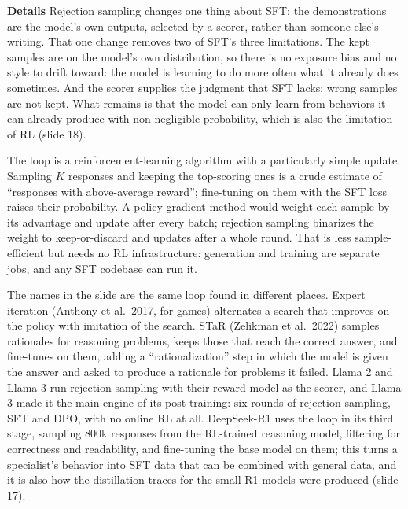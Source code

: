 \documentclass[11pt,letterpaper]{article}
\newcommand{\para}[1]{\medskip\noindent\textbf{#1}\quad}
\begin{document}
\para{Details} Rejection sampling changes one thing about SFT: the demonstrations are the model's own outputs, selected by a scorer, rather than someone else's writing. That one change removes two of SFT's three limitations. The kept samples are on the model's own distribution, so there is no exposure bias and no style to drift toward: the model is learning to do more often what it already does sometimes. And the scorer supplies the judgment that SFT lacks: wrong samples are not kept. What remains is that the model can only learn from behaviors it can already produce with non-negligible probability, which is also the limitation of RL (slide 18).

The loop is a reinforcement-learning algorithm with a particularly simple update. Sampling $K$ responses and keeping the top-scoring ones is a crude estimate of ``responses with above-average reward''; fine-tuning on them with the SFT loss raises their probability. A policy-gradient method would weight each sample by its advantage and update after every batch; rejection sampling binarizes the weight to keep-or-discard and updates after a whole round. That is less sample-efficient but needs no RL infrastructure: generation and training are separate jobs, and any SFT codebase can run it.

The names in the slide are the same loop found in different places. Expert iteration (Anthony et al.\ 2017, for games) alternates a search that improves on the policy with imitation of the search. STaR (Zelikman et al.\ 2022) samples rationales for reasoning problems, keeps those that reach the correct answer, and fine-tunes on them, adding a ``rationalization'' step in which the model is given the answer and asked to produce a rationale for problems it failed. Llama 2 and Llama 3 run rejection sampling with their reward model as the scorer, and Llama 3 made it the main engine of its post-training: six rounds of rejection sampling, SFT and DPO, with no online RL at all. DeepSeek-R1 uses the loop in its third stage, sampling 800k responses from the RL-trained reasoning model, filtering for correctness and readability, and fine-tuning the base model on them; this turns a specialist's behavior into SFT data that can be combined with general data, and it is also how the distillation traces for the small R1 models were produced (slide 17).
\end{document}
